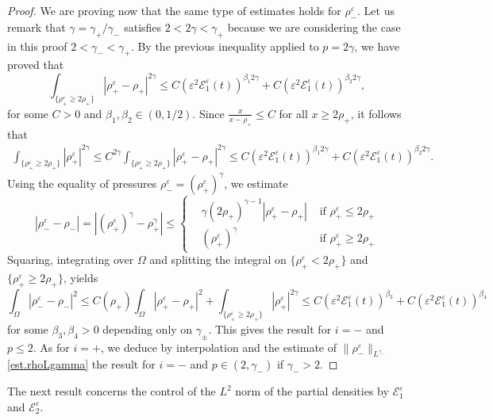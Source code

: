 \documentclass[11pt, twoside, a4paper]{article}
\theoremstyle{plain}
\theoremstyle{remark}
\numberwithin{equation}{section}
\def\EE{{\mathcal E}}
\renewcommand{\leq}{\leqslant}\renewcommand{\le}{\leqslant}
\renewcommand{\geq}{\geqslant}\renewcommand{\ge}{\geqslant}
\newcommand{\eps}{\varepsilon}
\newcommand{\rp}{\rho_+}
\newcommand{\rmi}{\rho_-}
\newcommand{\gm}{\gamma_-}
\begin{document}
\begin{proof}
We are proving now that the same type of estimates holds for $\rho_-^\varepsilon$.
Let us remark that $\gamma = \gamma_+/\gamma_-$ satisfies $2<2\gamma<\gamma_+$ because we are considering the case in this proof $2<\gamma_-<\gamma_+$. By the previous inequality applied to $p=2\gamma$, we have proved that
\[
\int_{\{\rho_+^\varepsilon \ge 2\rho_+\}}
|\rho_+^\varepsilon-\rho_+|^{2\gamma} \leq C(\eps^2 \EE_1^\eps(t))^{\beta_1 2\gamma}+C(\eps^2 \EE_1^\eps(t))^{\beta_2 2\gamma} ,
\]
for some $C>0$ and $\beta_1,\beta_2\in (0,1/2)$.
Since $\frac{x}{x-\rho_+}\le C$ for all $x\ge 2\rho_+$, it follows that
\begin{align*}
 \int_{\{\rp^\eps \geq 2\rp\}} |\rp^\eps|^{2\gamma} \leq C^{2\gamma}\int_{\{\rp^\eps \geq 2\rp\}} |\rp^\eps - \rp |^{2\gamma} \leq C(\eps^2 \EE_1^\eps(t))^{\beta_1 2\gamma}+C(\eps^2 \EE_1^\eps(t))^{\beta_2 2\gamma}.
\end{align*}
Using the equality of pressures $\rho_-^\varepsilon=(\rho_+^\varepsilon)^\gamma$, we estimate
\begin{equation*}
 |\rmi^\eps - \rmi | = |(\rp^\eps)^{\gamma} - \rp^{\gamma}| \leq \left\{
 \begin{array}{lll}
 &\gamma(2\rp)^{\gamma-1} |\rp^\eps - \rp| &\mbox{ if } \rp^\eps \leq 2\rp\\
 & (\rp^\eps)^\gamma &\mbox{ if } \rp^\eps \geq 2 \rp
 \end{array}
\right.
\end{equation*}
Squaring, integrating over $\Omega$ and splitting the integral on $\{ \rp^\eps < 2\rp\}$ and $\{ \rp^\eps \geq 2\rp\}$, yields
\begin{equation*}
 \int_\Omega |\rmi^\eps - \rmi |^2 \leq C(\rp) \int_\Omega |\rp^\eps - \rp|^2 +\int_{\{\rp^\eps \geq 2\rp\}} |\rp^\eps|^{2\gamma}
 \leq C(\eps^2 \EE_1^\eps(t))^{\beta_3}+C(\eps^2 \EE_1^\eps(t))^{\beta_4}
\end{equation*}
for some $\beta_3,\beta_4>0$ depending only on $\gamma_\pm$. This gives the result for $i=-$ and $p\leq 2$. As for $i=+$, we deduce by interpolation and the estimate of $\|\rho_-^\eps\|_{L^{\gm}}$ \eqref{est.rhoLgamma} the result for $i=-$ and $p\in (2,\gamma_-)$ if $\gamma_->2$.
\end{proof}

The next result concerns the control of the $L^2$ norm of the partial densities by $\EE_1^\eps$ and $\EE_2^\eps$.
\end{document}
